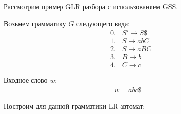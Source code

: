 \begin{example}
    \label{glr:example}
    Рассмотрим пример GLR разбора с использованием GSS.

    Возьмем грамматику $G$ следующего вида:
    \begin{align*}
        &0.\quad S' \to S\$ \\
        &1.\quad S \to abC \\
        &2.\quad S \to aBC \\
        &3.\quad B \to b \\
        &4.\quad C \to c
    \end{align*}

    Входное слово $ w $:
    \begin{align*}
        w = abc\$
    \end{align*}

    Построим для данной грамматики LR автомат:

    \begin{tikzpicture}[x=0.75pt,y=0.75pt,yscale=-1,xscale=1]



\end{tikzpicture}
\end{example}
